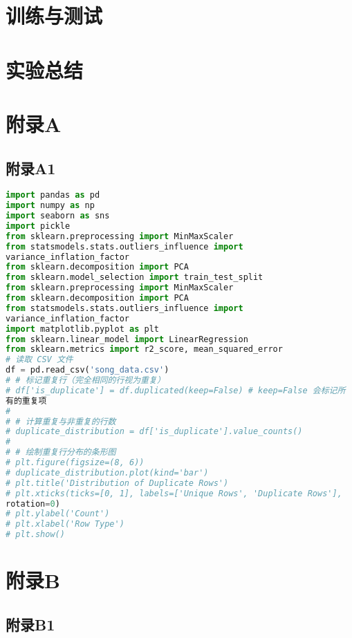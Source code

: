 \documentclass[12pt]{article}
\begin{document}
\section{训练与测试}

\section{实验总结}



\newpage
\appendix
\section*{附录A}
\subsection*{附录A1}
\begin{lstlisting}[language=Python, caption=Python example]
import pandas as pd
import numpy as np
import seaborn as sns
import pickle
from sklearn.preprocessing import MinMaxScaler
from statsmodels.stats.outliers_influence import
variance_inflation_factor
from sklearn.decomposition import PCA
from sklearn.model_selection import train_test_split
from sklearn.preprocessing import MinMaxScaler
from sklearn.decomposition import PCA
from statsmodels.stats.outliers_influence import
variance_inflation_factor
import matplotlib.pyplot as plt
from sklearn.linear_model import LinearRegression
from sklearn.metrics import r2_score, mean_squared_error
# 读取 CSV 文件
df = pd.read_csv('song_data.csv')
# # 标记重复行（完全相同的行视为重复）
# df['is_duplicate'] = df.duplicated(keep=False) # keep=False 会标记所
有的重复项
#
# # 计算重复与非重复的行数
# duplicate_distribution = df['is_duplicate'].value_counts()
#
# # 绘制重复行分布的条形图
# plt.figure(figsize=(8, 6))
# duplicate_distribution.plot(kind='bar')
# plt.title('Distribution of Duplicate Rows')
# plt.xticks(ticks=[0, 1], labels=['Unique Rows', 'Duplicate Rows'],
rotation=0)
# plt.ylabel('Count')
# plt.xlabel('Row Type')
# plt.show()
\end{lstlisting}

\section*{附录B}
\subsection*{附录B1}
\end{document}
